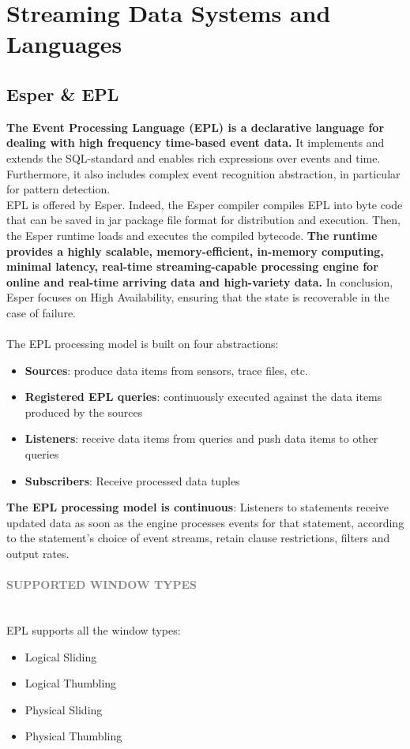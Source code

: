 \documentclass[10pt,a4paper]{article}
\newcommand{\nline}{\\~\\}
\newcommand{\myparagraph}[1]{\paragraph{\normalsize{\textcolor{gray}{\uppercase{\textbf{#1}}}} }\mbox{} \vspace{0.5em}\\}
\begin{document}
\pagebreak

\section{Streaming Data Systems and Languages}
\subsection{Esper \& EPL}
\textbf{The Event Processing Language (EPL) is a declarative language for dealing with high frequency time-based event data.} It implements and extends the SQL-standard and enables rich expressions over events and time. Furthermore, it also includes complex event recognition abstraction, in particular for pattern detection.  \\
EPL is offered by Esper. Indeed, the Esper compiler compiles EPL into byte code that can be saved in jar package file format for distribution and execution. Then, the Esper runtime loads and executes the compiled bytecode. \textbf{The runtime provides a highly scalable, memory-efficient, in-memory computing, minimal latency, real-time streaming-capable processing engine for online and real-time arriving data and high-variety data.} In conclusion, Esper focuses on High Availability, ensuring that the state is recoverable in the case of failure.
\nline
The EPL processing model is built on four abstractions:
\begin{itemize}
	\item \textbf{Sources}: produce data items from sensors, trace files, etc.
	\item \textbf{Registered EPL queries}: continuously executed against the data items produced by the sources
	\item \textbf{Listeners}: receive data items from queries and push data items to other queries
	\item \textbf{Subscribers}: Receive processed data tuples
\end{itemize}
\textbf{The EPL processing model is continuous}:
Listeners to statements receive updated data as soon as the engine processes events for that statement, according to the statement’s choice of event streams, retain clause restrictions, filters and output rates.
\myparagraph{Supported Window Types}
EPL supports all the window types:
\begin{itemize}
	\item Logical Sliding
	\item Logical Thumbling
	\item Physical Sliding
	\item Physical Thumbling
\end{itemize}
\end{document}
